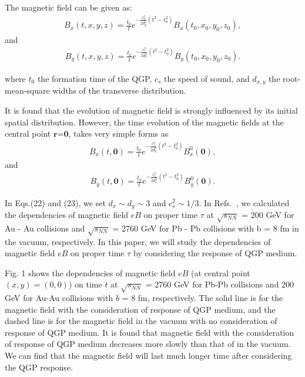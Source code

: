 \documentclass[twocolumn,showpacs,preprintnumbers,amsmath,amssymb]{revtex4}
\begin{document}
The magnetic field can be given as:
\begin{eqnarray}
B_{x}(t,x,y,z)=\frac{t_{0}}{t}e^{-\frac{c_{s}^{2}}{2d_{y}^{2}}(t^{2}-t_{0}^{2})}B_{x}(t_{0},x_{0},y_{0},z_{0}),
\label{eq:eq20} %
\end{eqnarray}
\noindent and
\begin{eqnarray}
B_{y}(t,x,y,z)=\frac{t_{0}}{t}e^{-\frac{c_{s}^{2}}{2d_{x}^{2}}(t^{2}-t_{0}^{2})}B_{y}(t_{0},x_{0},y_{0},z_{0}).
\label{eq:eq21} %
\end{eqnarray}

\noindent where  $t_{0}$ the formation time of the QGP, $c_{s}$
the speed of sound, and $d_{x,y}$ the root-mean-square widths of the transverse distribution.   

It is found that the evolution of magnetic field is strongly influenced by its initial spatial distribution.
However, the time evolution of the magnetic fields at the central point $\textbf{r=0}$, takes very simple forms as
\begin{eqnarray}
B_{x}(t,\mathbf{0})=\frac{t_{0}}{t}e^{-\frac{c_{s}^{2}}{2d_{y}^{2}}(t^{2}-t_{0}^{2})}B_{x}^{0}(\mathbf{0}),
\label{eq:eq22} %
\end{eqnarray}
\noindent and
\begin{eqnarray}
B_{y}(t,\mathbf{0})=\frac{t_{0}}{t}e^{-\frac{c_{s}^{2}}{2d_{x}^{2}}(t^{2}-t_{0}^{2})}B_{y}^{0}(\mathbf{0}).
\label{eq:eq23} %
\end{eqnarray}

In Eqs.(22) and (23), we set $d_{x}\sim d_{y}\sim3$ and $c_{s}^{2}\sim1/3$. In Refs.~\cite{lab14,lab15}, we calculated the dependencies of magnetic field $eB$
on proper time $\tau$ at $\sqrt{s_{NN}}$ = 200 GeV for Au - Au collisions  and  $\sqrt{s_{NN}}$ = 2760 GeV for Pb - Pb collisions with b = 8 fm in the vacuum, respectively.
In this paper, we will study the dependencies of magnetic field $eB$ on proper time $\tau$ by considering the response of QGP medium.

Fig. 1 shows the dependencies of magnetic field $eB$ (at central point $(x, y) = (0, 0)$) on  time $t$ at $\sqrt{s_{NN}}$ = 2760 GeV for Pb-Pb collisions and 200 GeV for Au-Au
collisions with $b$ = 8 fm, respectively. The solid line is for the magnetic field with the consideration of response of QGP medium, and the dashed line is for the magnetic field in the vacuum with no consideration
of response of QGP medium. It is found that magnetic field with the consideration of response of QGP medium decreases more slowly than that of in the vacuum. We can find that
the magnetic field will last much longer time after considering the QGP response.
\end{document}
